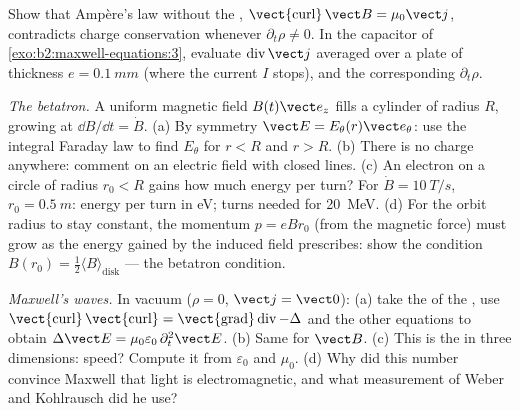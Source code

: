 \begin{exercise}[$\star\star$]\label{exo:b2:maxwell-equations:9}
Show that Ampère's law without the , $\operatorname{\vect{curl}}
\vect B = \mu_0\vect j$, contradicts charge conservation whenever $\partial_t\rho
\ne 0$. In the capacitor of \cref{exo:b2:maxwell-equations:3}, evaluate
$\operatorname{div}\vect j$ averaged over a plate of thickness $e = \qty{0.1}{mm}$
(where the current $I$ stops), and the corresponding $\partial_t\rho$.
\end{exercise}

\begin{exercise}[$\star\star\star$]\label{exo:b2:maxwell-equations:10}
\emph{The betatron.} A uniform magnetic field $B(t)\vect e_z$ fills a
cylinder of radius $R$, growing at $\dd B/\dd t = \dot B$. (a) By symmetry
$\vect E = E_\theta(r)\vect e_\theta$: use the integral Faraday law to find $E_\theta$
for $r < R$ and $r > R$. (b) There is no charge anywhere: comment on an
electric field with closed lines. (c) An electron on a circle of
radius $r_0 < R$ gains how much energy per turn? For $\dot B = \qty{10}{T/s}$,
$r_0 = \qty{0.5}{m}$: energy per turn in eV; turns needed for \qty{20}{MeV}.
(d) For the orbit radius to stay constant, the momentum $p = eBr_0$ (from
the magnetic force) must grow as the energy gained by the induced field
prescribes: show the condition $B(r_0) = \tfrac12\langle B\rangle_{\text{disk}}$
--- the betatron condition.
\end{exercise}

\begin{exercise}[$\star\star\star$]\label{exo:b2:maxwell-equations:11}
\emph{Maxwell's waves.} In vacuum ($\rho = 0$, $\vect j = \vect 0$): (a) take
the  of the , use $\operatorname{\vect{curl}}
\operatorname{\vect{curl}} = \operatorname{\vect{grad}}\operatorname{div} - \Delta$ and the other
equations to obtain $\Delta\vect E = \mu_0\varepsilon_0\,\partial_t^2\vect E$. (b) Same for
$\vect B$. (c) This is the  in three dimensions: speed?
Compute it from $\varepsilon_0$ and $\mu_0$. (d) Why did this number convince
Maxwell that light is electromagnetic, and what measurement of
Weber and Kohlrausch did he use?
\end{exercise}

